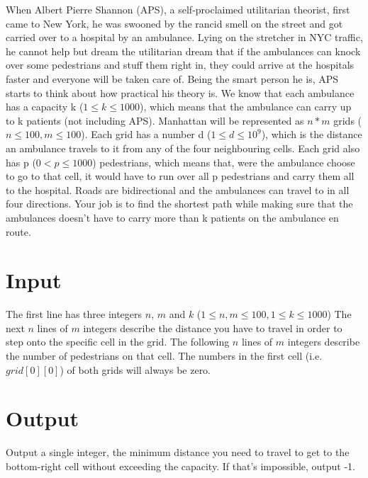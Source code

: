 When Albert Pierre Shannon (APS), a self-proclaimed utilitarian theorist, 
first came to New York, he was swooned by the rancid smell on the street 
and got carried over to a hospital by an ambulance. Lying on the stretcher in NYC traffic, 
he cannot help but dream the utilitarian dream that if the ambulances can knock over some 
pedestrians and stuff them right in, they could arrive at the hospitals faster and everyone 
will be taken care of. Being the smart person he is, APS starts to think about how practical 
his theory is. We know that each ambulance has a capacity k ($1 \leq k \leq 1000$),
which means that the ambulance can carry up to k patients (not including APS). 
Manhattan will be represented as $n*m$ grids ($n \leq 100, m \leq 100$).
Each grid has a number d ($1 \leq d \leq 10^9$), 
which is the distance an ambulance travels to it from any of the four neighbouring cells.
Each grid also has p ($0 < p \leq 1000$) pedestrians, which means that, were the 
ambulance choose to go to that cell, it would have to run over all p pedestrians 
and carry them all to the hospital. Roads are bidirectional and the ambulances can travel
to in all four directions.
Your job is to find the shortest path while making sure that the ambulances 
doesn’t have to carry more than k patients on the ambulance en route.

\section*{Input}
The first line has three integers $n$, $m$ and $k$ ($1 \leq n,m \leq 100, 1 \leq k \leq 1000$)
The next $n$ lines of $m$ integers describe the distance you have to travel 
in order to step onto the specific cell in the grid.
The following $n$ lines of $m$ integers describe the number of pedestrians on that cell.
The numbers in the first cell (i.e. $grid[0][0]$) of both grids will always be zero.

\section*{Output}
Output a single integer, the minimum distance you need to travel to get to the bottom-right cell
without exceeding the capacity. If that's impossible, output -1.